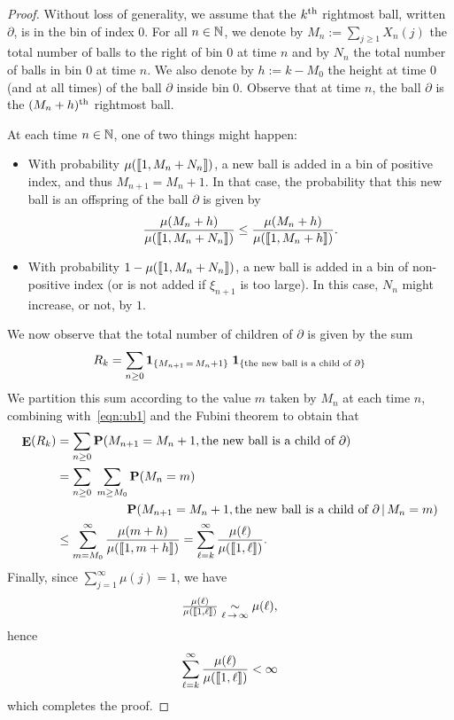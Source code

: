 \documentclass[AHL,Unicode,longabstracts,published]{cedram}
\DeclareMathOperator{\E}{\mathbf{E}}
\newcommand{\bbN}{\mathbb{N}}
\newcommand{\ind}[1]{\mathbf{1}_{\left\{#1\right\}}}
\renewcommand{\P}{\mathbf{P}}
\let\originalleft\left
\let\originalright\right
\renewcommand{\left}{\mathopen{}\mathclose\bgroup\originalleft}
\renewcommand{\right}{\aftergroup\egroup\originalright}
\let\oldin\in
\renewcommand{\in}{\mathchoice{\oldin}{\oldin}{\,\oldin\,}{\,\oldin\,}}
\renewcommand*{\to}{\mathchoice{\longrightarrow}{\rightarrow}{\rightarrow}{\rightarrow}}
\newcommand{\llbracket}{\mathopen{[\mkern -2.7mu[}}
\newcommand{\rrbracket}{\mathclose{]\mkern -2.7mu]}}
\newcommand{\llb}{\llbracket}
\newcommand{\rrb}{\rrbracket}
\begin{document}
\begin{proof}
Without loss of generality, we assume that the $k^{\rm th}$ rightmost ball, written~$\partial$, is in the bin of index $0$. For all $n \in \bbN$, we denote by $M_n
:= \sum_{j \geq 1} X_n(j)$ the total number of balls to the right of bin $0$ at time $n$ and by $N_n$ the total number of balls in bin $0$ at time $n$. We also denote by $h
:= k -M_0$ the height at time $0$ (and at all times) of the ball $\partial$ inside bin $0$. Observe that at time $n$, the ball $\partial$ is the $(M_n+h)^{\rm th}$ rightmost ball.

At each time $n \in \bbN$, one of two things might happen:
\begin{itemize}
\item With probability $\mu(\llb 1,M_n+N_n\rrb )$, a new ball is added in a bin of positive index, and thus $M_{n+1} = M_n +1$. In that case, the probability that this new ball is an offspring of the ball $\partial$ is given by
\begin{equation}\label{eqn:ub1}
\frac{\mu(M_n + h)}{\mu(\llb 1,M_n+N_n\rrb )} \leq \frac{\mu(M_n + h)}{\mu(\llb 1,M_n+h\rrb )}.
\end{equation}
\item With probability $1 - \mu(\llb 1,M_n+N_n\rrb )$, a new ball is added in a bin of non-positive index (or is not added if $\xi_{n+1}$ is too large). In this case, $N_n$ might increase, or not, by $1$.
\end{itemize}
We now observe that the total number of children of $\partial$ is given by the sum
\[
R_k = \sum_{n \geq 0} \ind{M_{n+1}\,=\, M_n + 1} \;\ind{\text{the new ball is a child of $\partial$}}
\]
We partition this sum according to the value $m$ taken by $M_n$ at each time $n$, combining with~\eqref{eqn:ub1} and the Fubini theorem to obtain that
\begin{align*}
\E(R_k) & = \sum_{n \geq 0} \P\left(M_{n+1} = M_n + 1, \text{the new ball is a child of $\partial$}\right)\\
& = \sum_{n \geq 0}\; \sum_{m \geq M_0}\P(M_n = m) \\
&\mkern103mu
\P\left(M_{n+1} = M_n+1, 
\text{the new ball is a child of $\partial$}\,\middle|\,M_n = m\right)\\
& \leq \sum_{m=M_0}^\infty \frac{\mu(m+h)}{\mu(\llb 1,m+h \rrb)} = \sum_{\ell=k}^\infty \frac{\mu(\ell)}{\mu(\llb 1,\ell\rrb )}.
\end{align*}
Finally, since $\sum_{j=1}^\infty \mu(j)=1$, we have
\[
\tfrac{\mu(\ell)}{\mu(\llb 1,\ell\rrb )}\underset{\ell\,\to\,\infty}{\sim}\mu(\ell),
\]
hence
\[
\sum_{\ell=k}^\infty \frac{\mu(\ell)}{\mu(\llb 1,\ell\rrb )} < \infty
\]
which completes the proof.
\end{proof}
\end{document}
